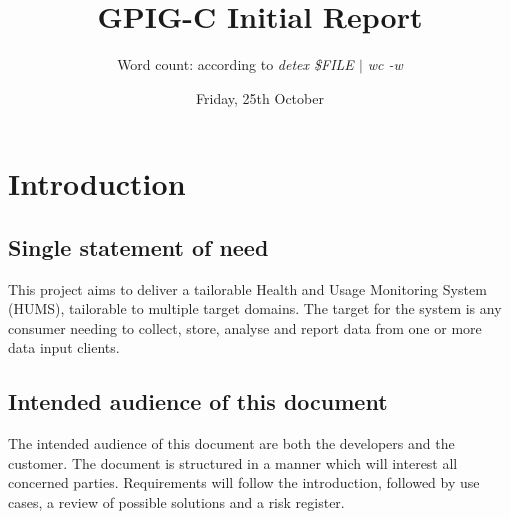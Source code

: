 \documentclass[10pt,a4paper]{article}
\begin{document}
\title{\vspace{-1cm}GPIG-C Initial Report}
\author{Word count: \textbf{} according to \textsl{detex \$FILE $\vert$ wc -w}}
\date{Friday, 25th October}
\maketitle
\thispagestyle{fancy} %

\section{Introduction}
\subsection{Single statement of need}
This project aims to deliver a tailorable Health and Usage Monitoring System (HUMS), tailorable to multiple target domains. The target for the system is any consumer needing to collect, store, analyse and report data from one or more data input clients.
\subsection{Intended audience of this document}
The intended audience of this document are both the developers and the customer. The document is structured in a manner which will interest all concerned parties. Requirements will follow the introduction, followed by use cases, a review of possible solutions and a risk register.
\end{document}
